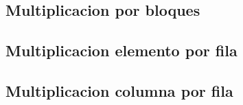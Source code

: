 \subsection{Multiplicacion por bloques}

    \def\model{ByBlocks}
    \def\analisisAmdahl{Podemos observar que}
    \def\analisisGustafson{Podemos ver que}
    
    \newpage

\subsection{Multiplicacion elemento por fila}

    \def\model{ElementByRowBlock}
    \def\analisisAmdahl{Podemos observar que}
    \def\analisisGustafson{Podemos ver que}
    
    \newpage

\subsection{Multiplicacion columna por fila}

    \def\model{ColumnByRow}
    \def\analisisAmdahl{Podemos observar que}
    \def\analisisGustafson{Podemos ver que}
    
    \newpage
    \clearpage
